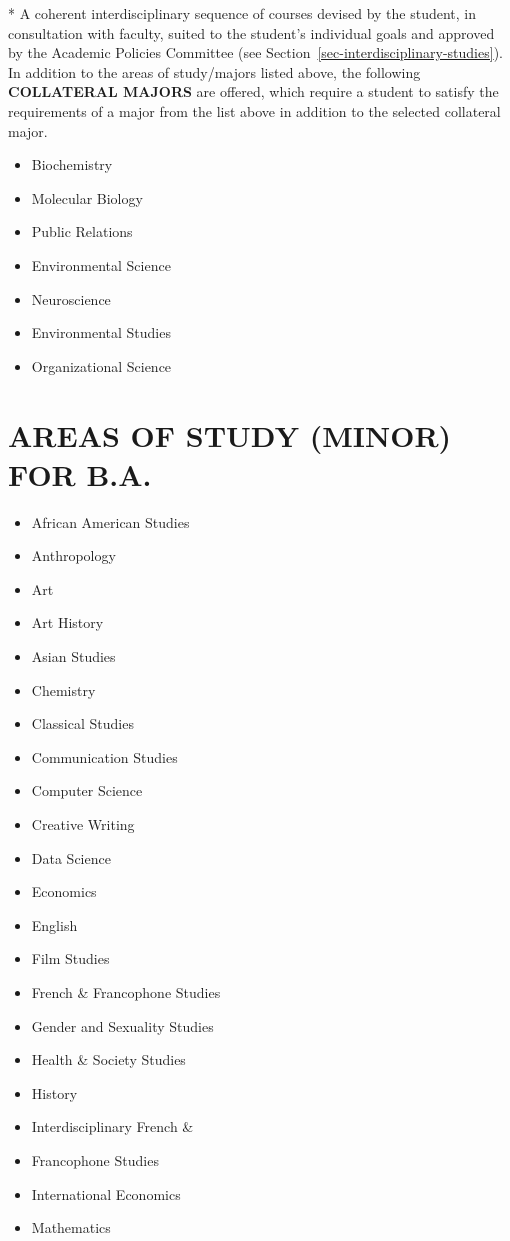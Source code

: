 \documentclass[
  letterpaper,
]{scrbook}
\providecommand{\tightlist}{%
  \setlength{\itemsep}{0pt}\setlength{\parskip}{0pt}}
\begin{document}
* A coherent interdisciplinary sequence of courses devised by the
student, in consultation with faculty, suited to the student's
individual goals and approved by the Academic Policies Committee (see
Section~\ref{sec-interdisciplinary-studies}). In addition to the areas
of study/majors listed above, the following \textbf{COLLATERAL MAJORS}
are offered, which require a student to satisfy the requirements of a
major from the list above in addition to the selected collateral major.

\begin{itemize}
\tightlist
\item
  Biochemistry
\item
  Molecular Biology
\item
  Public Relations
\item
  Environmental Science
\item
  Neuroscience
\item
  Environmental Studies
\item
  Organizational Science
\end{itemize}

\section{AREAS OF STUDY (MINOR) FOR
B.A.}\label{areas-of-study-minor-for-b.a.}

\begin{itemize}
\tightlist
\item
  African American Studies
\item
  Anthropology
\item
  Art
\item
  Art History
\item
  Asian Studies
\item
  Chemistry
\item
  Classical Studies
\item
  Communication Studies
\item
  Computer Science
\item
  Creative Writing
\item
  Data Science
\item
  Economics
\item
  English
\item
  Film Studies
\item
  French \& Francophone Studies
\item
  Gender and Sexuality Studies
\item
  Health \& Society Studies
\item
  History
\item
  Interdisciplinary French \&
\item
  Francophone Studies
\item
  International Economics
\item
  Mathematics
\end{itemize}
\end{document}
